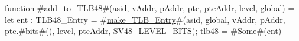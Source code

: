 function #\hyperref[sailRISCVzaddzytozyTLB48]{add\_to\_TLB48}#(asid, vAddr, pAddr, pte, pteAddr, level, global) = {
  let ent : TLB48_Entry = #\hyperref[sailRISCVzmakezyTLBzyEntry]{make\_TLB\_Entry}#(asid, global, vAddr, pAddr, pte.#\hyperref[sailRISCVzbits]{bits}#(), level, pteAddr, SV48_LEVEL_BITS);
  tlb48 = #\hyperref[sailRISCVzSome]{Some}#(ent)
}
